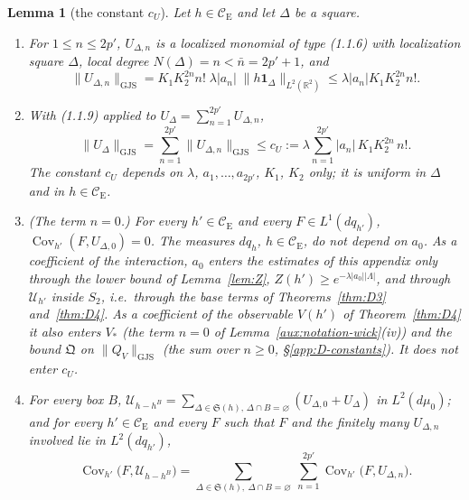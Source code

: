 \documentclass[11pt,a4paper]{article}
\theoremstyle{plain}
\theoremstyle{definition}
\theoremstyle{plain}
\newtheorem{auxlemma}{Lemma}
\theoremstyle{definition}
\newcommand{\R}{\mathbb{R}}
\newcommand{\CE}{\mathcal{C}_{\mathrm E}}
\DeclareMathOperator{\Cov}{Cov}
\newcommand{\GJS}[1]{\lVert #1\rVert_{\mathrm{GJS}}}   %
\newcommand{\Uc}{\mathcal U}
\newcommand{\dmu}{d\mu_0}
\begin{document}
\begin{auxlemma}[the constant $c_U$]\label{aux:notation-cU}
Let $h\in\CE$ and let $\Delta$ be a square.
\begin{enumerate}
\item[\textup{(i)}] For $1\le n\le2p'$, $U_{\Delta,n}$ is a localized monomial of type (1.1.6)
with localization square $\Delta$, local degree $N(\Delta)=n<\bar n=2p'+1$, and
\[
 \GJS{U_{\Delta,n}}=K_1K_2^{2n}n!\;\lambda|a_n|\;\|h\mathbf 1_\Delta\|_{L^2(\R^2)}
 \le\lambda|a_n|K_1K_2^{2n}n! .
\]
\item[\textup{(ii)}] With (1.1.9) applied to $U_\Delta=\sum_{n=1}^{2p'}U_{\Delta,n}$,
\[
 \GJS{U_\Delta}=\sum_{n=1}^{2p'}\GJS{U_{\Delta,n}}\le c_U:=\lambda\sum_{n=1}^{2p'}|a_n|\,K_1K_2^{2n}\,n! .
\]
The constant $c_U$ depends on $\lambda$, $a_1,\dots,a_{2p'}$, $K_1$, $K_2$ only; it is
uniform in $\Delta$ and in $h\in\CE$.
\item[\textup{(iii)}] \textup{(The term $n=0$.)}  For every $h'\in\CE$ and every $F\in
L^1(dq_{h'})$, $\Cov_{h'}(F,U_{\Delta,0})=0$.  The measures $dq_h$, $h\in\CE$, do not depend
on $a_0$.  As a coefficient of the interaction, $a_0$ enters the estimates of this appendix only
through the lower bound of Lemma~\ref{lem:Z}, $Z(h')\ge e^{-\lambda|a_0||\Lambda|}$, and
through $\Uc_{h'}$ inside $S_2$, i.e.\ through the base terms of Theorems~\ref{thm:D3}
and~\ref{thm:D4}.  As a coefficient of the observable $V(h')$ of Theorem~\ref{thm:D4} it also
enters $V_*$ (the term $n=0$ of Lemma~\ref{aux:notation-wick}(iv)) and the bound $\mathfrak Q$ on
$\GJS{Q_V}$ (the sum over $n\ge0$, \S\ref{app:D-constants}).  It does not enter $c_U$.
\item[\textup{(iv)}] For every box $B$,
$\Uc_{h-h^B}=\sum_{\Delta\in\mathfrak S(h),\,\Delta\cap B=\varnothing}(U_{\Delta,0}+U_\Delta)$
in $L^2(\dmu)$; and for every $h'\in\CE$ and every $F$ such that $F$ and the finitely many
$U_{\Delta,n}$ involved lie in $L^2(dq_{h'})$,
\[
 \Cov_{h'}\bigl(F,\Uc_{h-h^B}\bigr)=\sum_{\Delta\in\mathfrak S(h),\ \Delta\cap B=\varnothing}\
 \sum_{n=1}^{2p'}\Cov_{h'}\bigl(F,U_{\Delta,n}\bigr) .
\]
\end{enumerate}
\end{auxlemma}
\end{document}
